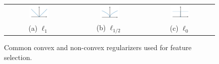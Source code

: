 


 \begin{figure}[t]
    \centering
    \begin{tabular}{ccc}
        \includegraphics[width=0.3\textwidth]{figures/l1_regularizer.pdf}
&
           \includegraphics[width=0.3\textwidth]{figures/lh_regularizer.pdf}
    &
    \includegraphics[width=0.3\textwidth]{figures/l0_regularizer.pdf}\\
              (a) $\ell_1$  & (b) $\ell_{1/2}$ & (c) $\ell_0$
    \end{tabular}
    \caption{Common convex and non-convex regularizers used for feature selection.}
    \label{fig:regularizers}
\end{figure}


